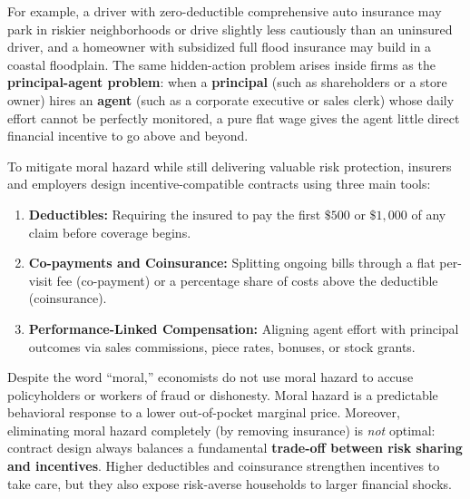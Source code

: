 \documentclass[11pt,letterpaper]{article}
\begin{document}
For example, a driver with zero-deductible comprehensive auto insurance may park in riskier neighborhoods or drive slightly less cautiously than an uninsured driver, and a homeowner with subsidized full flood insurance may build in a coastal floodplain. The same hidden-action problem arises inside firms as the \textbf{principal-agent problem}: when a \textbf{principal} (such as shareholders or a store owner) hires an \textbf{agent} (such as a corporate executive or sales clerk) whose daily effort cannot be perfectly monitored, a pure flat wage gives the agent little direct financial incentive to go above and beyond.

To mitigate moral hazard while still delivering valuable risk protection, insurers and employers design incentive-compatible contracts using three main tools:
\begin{enumerate}
    \item \textbf{Deductibles:} Requiring the insured to pay the first $\$500$ or $\$1{,}000$ of any claim before coverage begins.
    \item \textbf{Co-payments and Coinsurance:} Splitting ongoing bills through a flat per-visit fee (co-payment) or a percentage share of costs above the deductible (coinsurance).
    \item \textbf{Performance-Linked Compensation:} Aligning agent effort with principal outcomes via sales commissions, piece rates, bonuses, or stock grants.
\end{enumerate}

\begin{tcolorbox}[colback=yellow!10!white,colframe=orange!80!black,title=\textbf{Clear It Up: Moral Hazard Is About Incentives, Not Bad Character}]
Despite the word ``moral,'' economists do not use moral hazard to accuse policyholders or workers of fraud or dishonesty. Moral hazard is a predictable behavioral response to a lower out-of-pocket marginal price. Moreover, eliminating moral hazard completely (by removing insurance) is \emph{not} optimal: contract design always balances a fundamental \textbf{trade-off between risk sharing and incentives}. Higher deductibles and coinsurance strengthen incentives to take care, but they also expose risk-averse households to larger financial shocks.
\end{tcolorbox}
\end{document}
